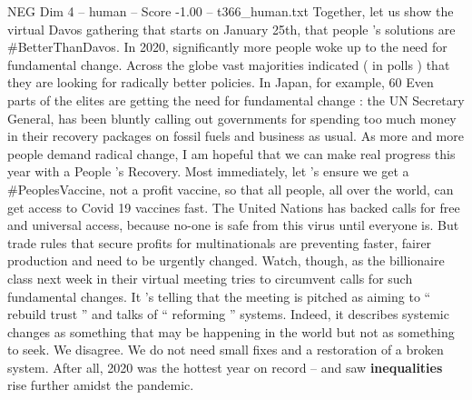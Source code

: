 \begin{textsample}{NEG Dim 4 – human – Score -1.00 – t366\_human.txt}
Together, let us show the virtual Davos gathering that starts on January 25th, that people ’s solutions are \#BetterThanDavos.
In 2020, significantly more people woke up to the need for fundamental change.
Across the globe vast majorities indicated ( in polls ) that they are looking for radically better policies.
In Japan, for example, 60 %
Even parts of the elites are getting the need for fundamental change : the UN Secretary General, has been bluntly calling out governments for spending too much money in their recovery packages on fossil fuels and business as usual.
As more and more people demand radical change, I am hopeful that we can make real progress this year with a People ’s Recovery.
Most immediately, let ’s ensure we get a \#PeoplesVaccine, not a profit vaccine, so that all people, all over the world, can get access to Covid 19 vaccines fast.
The United Nations has backed calls for free and universal access, because no-one is safe from this virus until everyone is.
But trade rules that secure profits for multinationals are preventing faster, fairer production and need to be urgently changed.
Watch, though, as the billionaire class next week in their virtual meeting tries to circumvent calls for such fundamental changes.
It ’s telling that the meeting is pitched as aiming to “ rebuild trust ” and talks of “ reforming ” systems.
Indeed, it describes systemic changes as something that may be happening in the world but not as something to seek.
We disagree.
We do not need small fixes and a restoration of a broken system.
After all, 2020 was the hottest year on record – and saw \textbf{inequalities} rise further amidst the pandemic.

\end{textsample}
